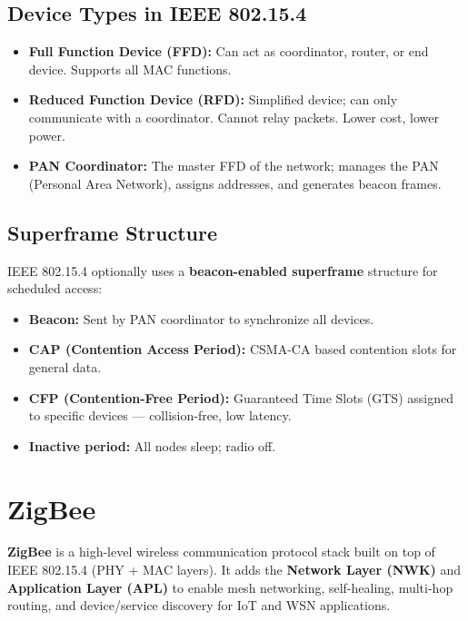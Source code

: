 \documentclass[12pt,a4paper]{article}
\begin{document}
\subsection{Device Types in IEEE 802.15.4}
\begin{itemize}[leftmargin=*, itemsep=3pt]
  \item \textbf{Full Function Device (FFD):} Can act as coordinator, router, or end device. Supports all MAC functions.
  \item \textbf{Reduced Function Device (RFD):} Simplified device; can only communicate with a coordinator. Cannot relay packets. Lower cost, lower power.
  \item \textbf{PAN Coordinator:} The master FFD of the network; manages the PAN (Personal Area Network), assigns addresses, and generates beacon frames.
\end{itemize}

\subsection{Superframe Structure}

IEEE 802.15.4 optionally uses a \textbf{beacon-enabled superframe} structure for scheduled access:

\begin{itemize}[leftmargin=*, itemsep=3pt]
  \item \textbf{Beacon:} Sent by PAN coordinator to synchronize all devices.
  \item \textbf{CAP (Contention Access Period):} CSMA-CA based contention slots for general data.
  \item \textbf{CFP (Contention-Free Period):} Guaranteed Time Slots (GTS) assigned to specific devices --- collision-free, low latency.
  \item \textbf{Inactive period:} All nodes sleep; radio off.
\end{itemize}

\section{ZigBee}

\begin{tcolorbox}[defbox, title={\textbf{ZigBee --- Definition}}]
\textbf{ZigBee} is a high-level wireless communication protocol stack built on top of IEEE 802.15.4 (PHY + MAC layers). It adds the \textbf{Network Layer (NWK)} and \textbf{Application Layer (APL)} to enable mesh networking, self-healing, multi-hop routing, and device/service discovery for IoT and WSN applications.
\end{tcolorbox}
\end{document}
